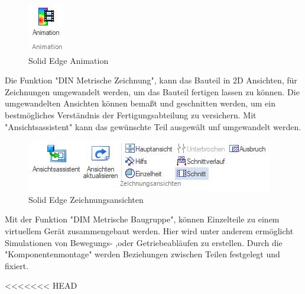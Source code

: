 \begin{figure} [H]
	\begin{center}
		\includegraphics[scale=0.4]{figures/mechanik/Solid Edge_Animation.jpg}
			\caption{Solid Edge Animation}
			\label{fig:Solid Edge Animation}
	\end{center}
\end{figure}


Die Funktion "DIN Metrische Zeichnung", kann das Bauteil in 2D Ansichten, für Zeichnungen umgewandelt werden, um das Bauteil fertigen lassen zu können. Die umgewandelten Ansichten können bemaßt und geschnitten werden, um ein bestmögliches Verständnis der Fertigungsabteilung zu versichern. Mit "Ansichtsassistent" kann das gewünschte Teil ausgewält unf umgewandelt werden.


\begin{figure} [H]
	\begin{center}
		\includegraphics[scale=0.4]{figures/mechanik/Solid Edge_Zeichnungsansichten.jpg}
			\caption{Solid Edge Zeichnungsansichten}
			\label{fig:Solid Edge Zeichnungsansichten}
	\end{center}
\end{figure}


Mit der Funktion "DIM Metrische Baugruppe", können Einzelteile zu einem virtuellem Gerät zusammengebaut werden. Hier wird unter anderem ermöglicht Simulationen von Bewegungs- ,oder Getriebeabläufen zu erstellen. Durch die "Komponentenmontage" werden Beziehungen zwischen Teilen festgelegt und fixiert.


<<<<<<< HEAD
